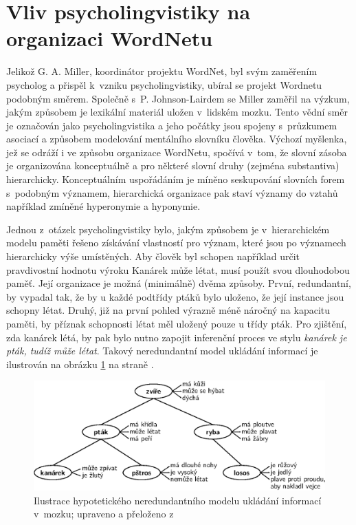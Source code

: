 \documentclass[a4paper, 11pt, oneside, showtrims]{book}
\newcommand\ex{\textsf}
\begin{document}

			\section{Vliv psycholingvistiky na organizaci WordNetu}
			\label{cha:psycho}

				Jelikož G. A. Miller, koordinátor projektu WordNet, byl svým zaměřením psycholog a přispěl k~vzniku psycholingvistiky, ubíral se projekt Wordnetu podobným směrem. Společně s~P. Johnson-Lairdem se Miller zaměřil na výzkum, jakým způsobem je lexikální materiál uložen v~lidském mozku. Tento vědní směr je označován jako psycholingvistika a jeho počátky jsou spojeny s~průzkumem asociací a způsobem modelování mentálního slovníku člověka. Výchozí myšlenka, jež se odráží i ve způsobu organizace WordNetu, spočívá v~tom, že slovní zásoba je organizována konceptuálně a pro některé slovní druhy (zejména substantiva) hierarchicky. Konceptuálním uspořádáním je míněno seskupování slovních forem s~podobným významem, hierarchická organizace pak staví významy do vztahů například zmíněné hyperonymie a hyponymie.

				Jednou z~otázek psycholingvistiky bylo, jakým způsobem je v~hierarchickém modelu paměti řešeno získávání vlastností pro význam, které jsou  po významech hierarchicky výše umístěných. Aby člověk byl schopen například určit pravdivostní hodnotu výroku \ex{Kanárek může létat}, musí použít svou dlouhodobou paměť. Její organizace je možná (minimálně) dvěma způsoby. První, redundantní, by vypadal tak, že by u každé podtřídy ptáků bylo uloženo, že její instance jsou schopny létat. Druhý, již na první pohled výrazně méně náročný na kapacitu paměti, by příznak schopnosti létat měl uložený pouze u třídy \ex{pták}. Pro zjištění, zda kanárek létá, by pak bylo nutno zapojit inferenční proces ve stylu \textit{kanárek je pták, tudíž může létat}. \parencite{collins1969retrieval} Takový neredundantní model ukládání informací je ilustrován na obrázku \ref{fig:canary-can-sing} na straně \pageref{fig:canary-can-sing}.

				\begin{figure}[h]
					\centering
					\includegraphics[width=1.0\textwidth]{canary-can-sing.eps}
					\caption{Ilustrace hypotetického neredundantního modelu ukládání informací v~mozku; upraveno a přeloženo z~\textcite{collins1969retrieval}}
					\label{fig:canary-can-sing}
				\end{figure}
\end{document}
